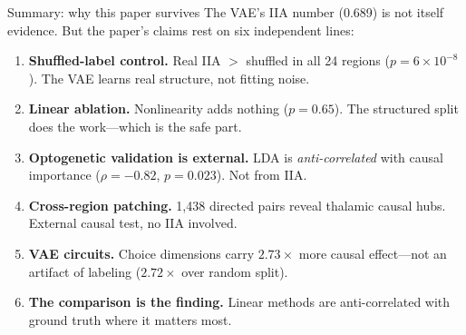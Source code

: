 \documentclass[aspectratio=169,11pt]{beamer}
\begin{document}
\begin{frame}{Summary: why this paper survives}
\vspace{-0.3em}
{\small The VAE's IIA number (0.689) is not itself evidence. But the paper's claims rest on six independent lines:}
\vspace{0.2em}
{\small
\begin{enumerate}\setlength\itemsep{1pt}
  \item \textbf{Shuffled-label control.} Real IIA $>$ shuffled in all 24 regions ($p = 6 \times 10^{-8}$). The VAE learns real structure, not fitting noise.
  \item \textbf{Linear ablation.} Nonlinearity adds nothing ($p = 0.65$). The structured split does the work---which is the safe part.
  \item \textbf{Optogenetic validation is external.} LDA is \emph{anti-correlated} with causal importance ($\rho = -0.82$, $p = 0.023$). Not from IIA.
  \item \textbf{Cross-region patching.} 1,438 directed pairs reveal thalamic causal hubs. External causal test, no IIA involved.
  \item \textbf{VAE circuits.} Choice dimensions carry $2.73\times$ more causal effect---not an artifact of labeling ($2.72\times$ over random split).
  \item \textbf{The comparison is the finding.} Linear methods are anti-correlated with ground truth where it matters most.
\end{enumerate}
}
\end{frame}
\end{document}
